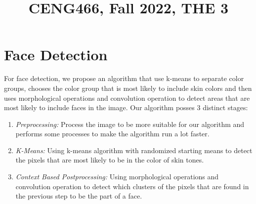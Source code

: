 \documentclass[conference]{IEEEtran}
\begin{document}
\title{CENG466, Fall 2022, THE 3\\

}

\author{
\and
{}
}

\maketitle

\begin{abstract}

\end{abstract}

\begin{IEEEkeywords}

\end{IEEEkeywords}

\section{Face Detection}
For face detection, we propose an algorithm that use k-means to separate color groups, chooses the color group that is most likely to include skin colors and then uses morphological operations and convolution operation to detect areas that are most likely to include faces in the image. Our algorithm posses 3 distinct stages:
\begin{enumerate}
	\item \textit{Preprocessing:} Process the image to be more suitable for our algorithm and performs some processes to make the algorithm run a lot faster.
	\item \textit{K-Means:} Using k-means algorithm with randomized starting means to detect the pixels that are most likely to be in the color of skin tones.
	\item \textit{Context Based Postprocessing:} Using morphological operations and convolution operation to detect which clusters of the pixels that are found in the previous step to be the part of a face.
\end{enumerate}
\end{document}
